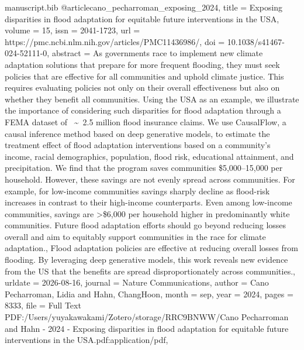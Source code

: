 \begin{filecontents*}[force]{manuscript.bib}
@article{cano_pecharroman_exposing_2024,
	title = {Exposing disparities in flood adaptation for equitable future interventions in the {USA}},
	volume = {15},
	issn = {2041-1723},
	url = {https://pmc.ncbi.nlm.nih.gov/articles/PMC11436986/},
	doi = {10.1038/s41467-024-52111-0},
	abstract = {As governments race to implement new climate adaptation solutions that prepare for more frequent flooding, they must seek policies that are effective for all communities and uphold climate justice. This requires evaluating policies not only on their overall effectiveness but also on whether they benefit all communities. Using the USA as an example, we illustrate the importance of considering such disparities for flood adaptation through a FEMA dataset of  {\textasciitilde} 2.5 million flood insurance claims. We use CausalFlow, a causal inference method based on deep generative models, to estimate the treatment effect of flood adaptation interventions based on a community’s income, racial demographics, population, flood risk, educational attainment, and precipitation. We find that the program saves communities \$5,000–15,000 per household. However, these savings are not evenly spread across communities. For example, for low-income communities savings sharply decline as flood-risk increases in contrast to their high-income counterparts. Even among low-income communities, savings are {\textgreater}\$6,000 per household higher in predominantly white communities. Future flood adaptation efforts should go beyond reducing losses overall and aim to equitably support communities in the race for climate adaptation., Flood adaptation policies are effective at reducing overall losses from flooding. By leveraging deep generative models, this work reveals new evidence from the US that the benefits are spread disproportionately across communities.},
	urldate = {2026-08-16},
	journal = {Nature Communications},
	author = {Cano Pecharroman, Lidia and Hahn, ChangHoon},
	month = sep,
	year = {2024},
	pages = {8333},
	file = {Full Text PDF:/Users/yuyakawakami/Zotero/storage/RRC9BNWW/Cano Pecharroman and Hahn - 2024 - Exposing disparities in flood adaptation for equitable future interventions in the USA.pdf:application/pdf},
}


\end{filecontents*}

\documentclass[8pt]{article}

\usepackage[margin=1in]{geometry}
\usepackage{amsmath}
\usepackage{float}
\usepackage{setspace}
\usepackage{authblk}
\usepackage{hyperref}
\usepackage{parskip}
\usepackage[numbers,sort&compress]{natbib}
\usepackage{xcolor}
\usepackage{longtable}
\usepackage{booktabs}
\usepackage{colortbl}
\usepackage{graphicx}
\usepackage{array}

